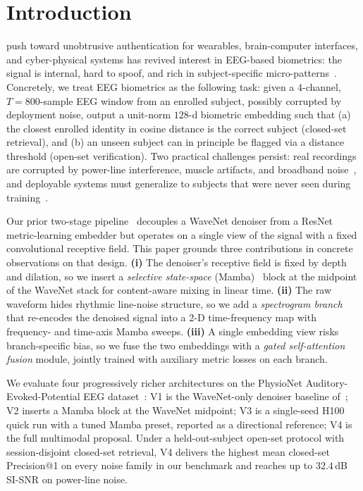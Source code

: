 \documentclass{IEEEtran}
\begin{document}
\section{Introduction}
\label{sec:introduction}
 push toward unobtrusive authentication for wearables,
brain-computer interfaces, and cyber-physical systems has revived interest
in EEG-based biometrics: the signal is internal, hard to spoof, and rich in
subject-specific micro-patterns~\cite{b12,b13,b14}. Concretely, we treat EEG
biometrics as the following task: given a 4-channel, $T=800$-sample EEG
window from an enrolled subject, possibly corrupted by deployment noise,
output a unit-norm $128$-d biometric embedding such that (a) the closest
enrolled identity in cosine distance is the correct subject (closed-set
retrieval), and (b) an unseen subject can in principle be flagged via a
distance threshold (open-set verification). Two practical challenges
persist: real recordings are corrupted by power-line interference, muscle
artifacts, and broadband noise~\cite{b11}, and deployable systems must
generalize to subjects that were never seen during
training~\cite{b6,b7}.

Our prior two-stage pipeline~\cite{b1} decouples a WaveNet denoiser from a
ResNet metric-learning embedder but operates on a single view of the signal
with a fixed convolutional receptive field. This paper grounds three
contributions in concrete observations on that design.
\textbf{(i)} The denoiser's receptive field is fixed by depth and
dilation, so we insert a \emph{selective state-space} (Mamba)~\cite{b3,b4}
block at the midpoint of the WaveNet stack for content-aware mixing in
linear time.
\textbf{(ii)} The raw waveform hides rhythmic line-noise structure, so we
add a \emph{spectrogram branch} that re-encodes the denoised signal into a
2-D time-frequency map with frequency- and time-axis Mamba sweeps.
\textbf{(iii)} A single embedding view risks branch-specific bias, so we
fuse the two embeddings with a \emph{gated self-attention fusion} module,
jointly trained with auxiliary metric losses on each branch.

We evaluate four progressively richer architectures on the PhysioNet
Auditory-Evoked-Potential EEG dataset~\cite{b11}: V1 is the WaveNet-only
denoiser baseline of~\cite{b1}; V2 inserts a Mamba block at the WaveNet
midpoint; V3 is a single-seed H100 quick run with a tuned Mamba preset,
reported as a directional reference; V4 is the full multimodal proposal.
Under a held-out-subject open-set protocol with session-disjoint closed-set
retrieval, V4 delivers the highest mean closed-set Precision@1 on every
noise family in our benchmark and reaches up to $32.4$\,dB SI-SNR on
power-line noise.
\end{document}
